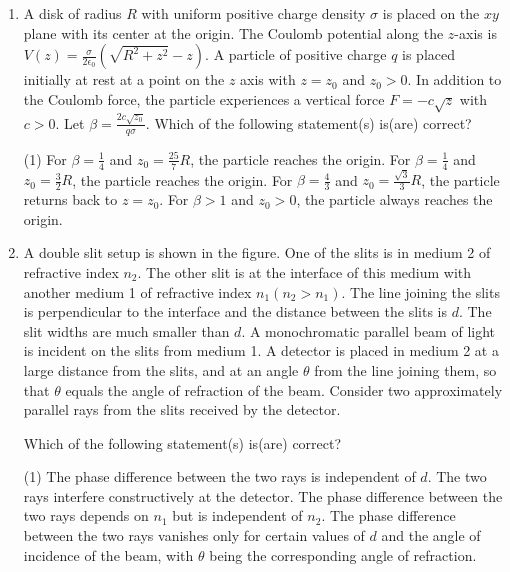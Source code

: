 \documentclass{article}
\begin{document}
\begin{enumerate}
    \item A disk of radius \( R \) with uniform positive charge density \( \sigma \) is placed on the \( xy \) plane with its center at the origin. The Coulomb potential along the \( z \)-axis is \( V(z) = \frac{\sigma}{2\epsilon_0}(\sqrt{R^2 + z^2} - z) \). A particle of positive charge \( q \) is placed initially at rest at a point on the \( z \) axis with \( z = z_0 \) and \( z_0 > 0 \). In addition to the Coulomb force, the particle experiences a vertical force \( F = -c \sqrt{z} \) with \( c > 0 \). Let \( \beta = \frac{2c\sqrt{z_0}}{q\sigma} \). Which of the following statement(s) is(are) correct?
        \begin{tasks}(1)
            \task For \( \beta = \frac{1}{4} \) and \( z_0 = \frac{25}{7} R \), the particle reaches the origin.
            \task For \( \beta = \frac{1}{4} \) and \( z_0 = \frac{3}{2} R \), the particle reaches the origin.
            \task For \( \beta = \frac{4}{3} \) and \( z_0 = \frac{\sqrt{3}}{3} R \), the particle returns back to \( z = z_0 \).
            \task For \( \beta > 1 \) and \( z_0 > 0 \), the particle always reaches the origin.
        \end{tasks}
    \item A double slit setup is shown in the figure. One of the slits is in medium 2 of refractive index \( n_2 \). The other slit is at the interface of this medium with another medium 1 of refractive index \( n_1 (n_2 > n_1) \). The line joining the slits is perpendicular to the interface and the distance between the slits is \( d \). The slit widths are much smaller than \( d \). A monochromatic parallel beam of light is incident on the slits from medium 1. A detector is placed in medium 2 at a large distance from the slits, and at an angle \( \theta \) from the line joining them, so that \( \theta \) equals the angle of refraction of the beam. Consider two approximately parallel rays from the slits received by the detector.
        
        \begin{center}
        \end{center}

        Which of the following statement(s) is(are) correct?
        \begin{tasks}(1)
            \task The phase difference between the two rays is independent of \( d \).
            \task The two rays interfere constructively at the detector.
            \task The phase difference between the two rays depends on \( n_1 \) but is independent of \( n_2 \).
            \task The phase difference between the two rays vanishes only for certain values of \( d \) and the angle of incidence of the beam, with \( \theta \) being the corresponding angle of refraction.
        \end{tasks}


\end{enumerate}
\end{document}
